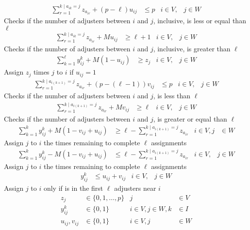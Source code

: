 \begin{align}
  \sum_{r = 1}^{k \mid a_{ik}=j}{
    z_{a_{ir}}
  }
  + (p-\ell) u_{ij}
  & \leq p
  & i \in V,
  & j \in W
\end{align}
Checks if
the number of adjusters between $i$ and $j$,
inclusive,
is less or equal than $\ell$
\begin{align}
  \sum_{r = 1}^{k \mid a_{ik}=j}{
    z_{a_{ir}}
  }
  + M u_{ij}
  & \geq \ell+1
  & i \in V,
  & j \in W
\end{align}
Checks if
the number of adjusters between $i$ and $j$,
inclusive,
is greater than $\ell$
\begin{align}
  \sum_{k = 1}^{\ell}{
    y_{ij}^{k}
  }
  + M (1 - u_{ij})
  & \geq z_j
  & i \in V,
  & j \in W
\end{align}
Assign $z_j$ times $j$ to $i$ if $u_{ij} = 1$
\begin{align}
  \sum_{r = 1}^{k \mid a_{i(k+1)}=j}{
    z_{a_{ir}}
  }
  + (p-(\ell-1)) v_{ij}
  & \leq p
  & i \in V,
  & j \in W
\end{align}
Checks if
the number of adjusters between $i$ and $j$,
is less than $\ell$
\begin{align}
  \sum_{r = 1}^{k \mid a_{i(k+1)}=j}{
    z_{a_{ir}}
  }
  + M v_{ij}
  & \geq \ell
  & i \in V,
  & j \in W
\end{align}
Checks if
the number of adjusters between $i$ and $j$,
is greater or equal than $\ell$
\begin{align}
  \sum_{k=1}^{k}{
    y_{ij}^{k}
  }
  + M (1 - v_{ij} + u_{ij})
  & \geq \ell
  - \sum_{r = 1}^{k \mid a_{i(k+1)}=j}{
    z_{a_{ir}}
  } 
  &  i \in V, j 
  & \in W
\end{align}
Assign $j$ to $i$
the times remaining to complete $\ell$ assignments
\begin{align}
  \sum_{k=1}^{k}{
    y_{ij}^{k}
  }
  - M (1 - v_{ij} + u_{ij})
  & \leq \ell 
  - \sum_{r = 1}^{k \mid a_{i(k+1)}=j}{
    z_{a_{ir}}
  }
  & i \in V,
  & j \in W
\end{align}
Assign $j$ to $i$
the times remaining to complete $\ell$ assignments
\begin{align}
  y_{ij}^{k}
  & \leq u_{ij}
  + v_{ij}
  & i \in V,
  & j \in W
\end{align}
Assign $j$ to $i$
only if
is in the first $\ell$ adjusters near $i$
\begin{align}
  z_j
  & \in \{0,1,\ldots,p\}
  & j
  & \in V \nonumber
  \\
  y_{ij}^{k} 
  & \in \{0,1\}
  & i\in V,j\in W,k
  & \in I \nonumber
  \\
  u_{ij},v_{ij}
  & \in \{0,1\}
  & i \in V,j
  & \in W \nonumber
\end{align}
